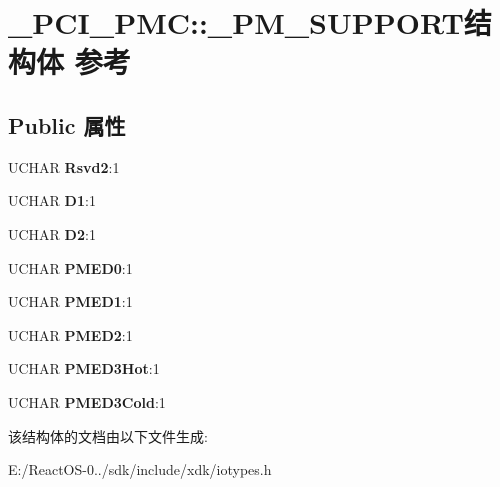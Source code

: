 \hypertarget{struct___p_c_i___p_m_c_1_1___p_m___s_u_p_p_o_r_t}{}\section{\+\_\+\+P\+C\+I\+\_\+\+P\+MC\+:\+:\+\_\+\+P\+M\+\_\+\+S\+U\+P\+P\+O\+R\+T结构体 参考}
\label{struct___p_c_i___p_m_c_1_1___p_m___s_u_p_p_o_r_t}
\subsection*{Public 属性}
\begin{DoxyCompactItemize}
\item 
\mbox{\label{struct___p_c_i___p_m_c_1_1___p_m___s_u_p_p_o_r_t_acbb4cc25beb394bf12e25888b6d449ea}} 
U\+C\+H\+AR {\bfseries Rsvd2}\+:1
\item 
\mbox{\label{struct___p_c_i___p_m_c_1_1___p_m___s_u_p_p_o_r_t_aa2604217aae403b792fc0ccfd458669d}} 
U\+C\+H\+AR {\bfseries D1}\+:1
\item 
\mbox{\label{struct___p_c_i___p_m_c_1_1___p_m___s_u_p_p_o_r_t_acaa5af52b2f5b6ba503fa85b3160e89b}} 
U\+C\+H\+AR {\bfseries D2}\+:1
\item 
\mbox{\label{struct___p_c_i___p_m_c_1_1___p_m___s_u_p_p_o_r_t_a62729d979dc34cd465deb5c25ad5e0db}} 
U\+C\+H\+AR {\bfseries P\+M\+E\+D0}\+:1
\item 
\mbox{\label{struct___p_c_i___p_m_c_1_1___p_m___s_u_p_p_o_r_t_af824e942a5b05748ff9b2e01d1e94c3b}} 
U\+C\+H\+AR {\bfseries P\+M\+E\+D1}\+:1
\item 
\mbox{\label{struct___p_c_i___p_m_c_1_1___p_m___s_u_p_p_o_r_t_af43fe82e00f795b5f538617e9e24c159}} 
U\+C\+H\+AR {\bfseries P\+M\+E\+D2}\+:1
\item 
\mbox{\label{struct___p_c_i___p_m_c_1_1___p_m___s_u_p_p_o_r_t_a0483b829dc462d9d184e0d7392c88125}} 
U\+C\+H\+AR {\bfseries P\+M\+E\+D3\+Hot}\+:1
\item 
\mbox{\label{struct___p_c_i___p_m_c_1_1___p_m___s_u_p_p_o_r_t_ac9e49b5194082e6a87fbc902cb8f4154}} 
U\+C\+H\+AR {\bfseries P\+M\+E\+D3\+Cold}\+:1
\end{DoxyCompactItemize}


该结构体的文档由以下文件生成\+:\begin{DoxyCompactItemize}
\item 
E\+:/\+React\+O\+S-\/0../sdk/include/xdk/iotypes.\+h\end{DoxyCompactItemize}
